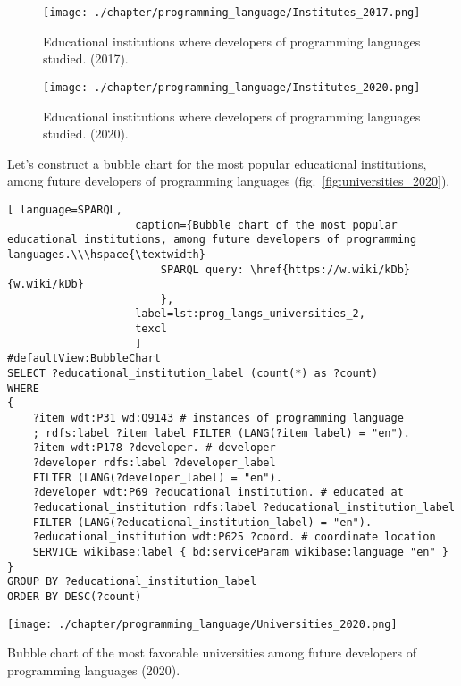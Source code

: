 \begin{figure}[h]
\centering
	\texttt{[image: ./chapter/programming\_language/Institutes\_2017.png]}
	\caption{Educational institutions where developers of programming languages studied. (2017).}
	\label{fig:institutes_2017}
\end{figure}

\begin{figure}[h]
\centering
	\texttt{[image: ./chapter/programming\_language/Institutes\_2020.png]}
	\caption{Educational institutions where developers of programming languages studied. (2020).}
	\label{fig:institutes_2020}
\end{figure}

Let's construct a bubble chart for the most popular educational institutions, among future developers of programming languages (fig.~\ref{fig:universities_2020}). 

\begin{lstlisting}[ language=SPARQL, 
                    caption={Bubble chart of the most popular educational institutions, among future developers of programming languages.\\\hspace{\textwidth}
                        SPARQL query: \href{https://w.wiki/kDb}{w.wiki/kDb}
                        },
                    label=lst:prog_langs_universities_2,
                    texcl 
                    ]
#defaultView:BubbleChart
SELECT ?educational_institution_label (count(*) as ?count)
WHERE
{
	?item wdt:P31 wd:Q9143 # instances of programming language
	; rdfs:label ?item_label FILTER (LANG(?item_label) = "en"). 
	?item wdt:P178 ?developer. # developer
	?developer rdfs:label ?developer_label
	FILTER (LANG(?developer_label) = "en"). 
	?developer wdt:P69 ?educational_institution. # educated at
	?educational_institution rdfs:label ?educational_institution_label
	FILTER (LANG(?educational_institution_label) = "en").
	?educational_institution wdt:P625 ?coord. # coordinate location 
	SERVICE wikibase:label { bd:serviceParam wikibase:language "en" } 	
}
GROUP BY ?educational_institution_label
ORDER BY DESC(?count)
\end{lstlisting}%

\begin{marginfigure}[-7cm]
	\texttt{[image: ./chapter/programming\_language/Universities\_2020.png]}
	\caption{Bubble chart of the most favorable universities among future developers of programming languages (2020).}
	\label{fig:universities_2020}
\end{marginfigure}

